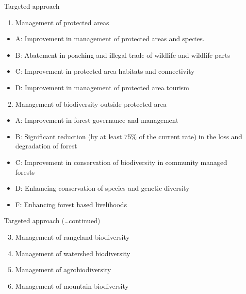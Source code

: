 \documentclass[ignorenonframetext,aspectratio=169]{beamer}
\providecommand{\tightlist}{%
  \setlength{\itemsep}{0pt}\setlength{\parskip}{0pt}}
\begin{document}
\begin{frame}{Targeted approach}
\protect\hypertarget{targeted-approach}{}

\begin{enumerate}
\tightlist
\item
  Management of protected areas
\end{enumerate}

\begin{itemize}
\tightlist
\item
  A: Improvement in management of protected areas and species.
\item
  B: Abatement in poaching and illegal trade of wildlife and wildlife
  parts
\item
  C: Improvement in protected area habitats and connectivity
\item
  D: Improvement in management of protected area tourism
\end{itemize}

\begin{enumerate}
\setcounter{enumi}{1}
\tightlist
\item
  Management of biodiversity outside protected area
\end{enumerate}

\begin{itemize}
\tightlist
\item
  A: Improvement in forest governance and management
\item
  B: Significant reduction (by at least 75\% of the current rate) in the
  loss and degradation of forest
\item
  C: Improvement in conservation of biodiversity in community managed
  forests
\item
  D: Enhancing conservation of species and genetic diversity
\item
  F: Enhancing forest based livelihoods
\end{itemize}

\end{frame}

\begin{frame}{Targeted approach (\ldots{}continued)}
\protect\hypertarget{targeted-approach-continued}{}

\begin{enumerate}
\setcounter{enumi}{2}
\tightlist
\item
  Management of rangeland biodiversity
\item
  Management of watershed biodiversity
\item
  Management of agrobiodiversity
\item
  Management of mountain biodiversity
\end{enumerate}

\end{frame}
\end{document}
